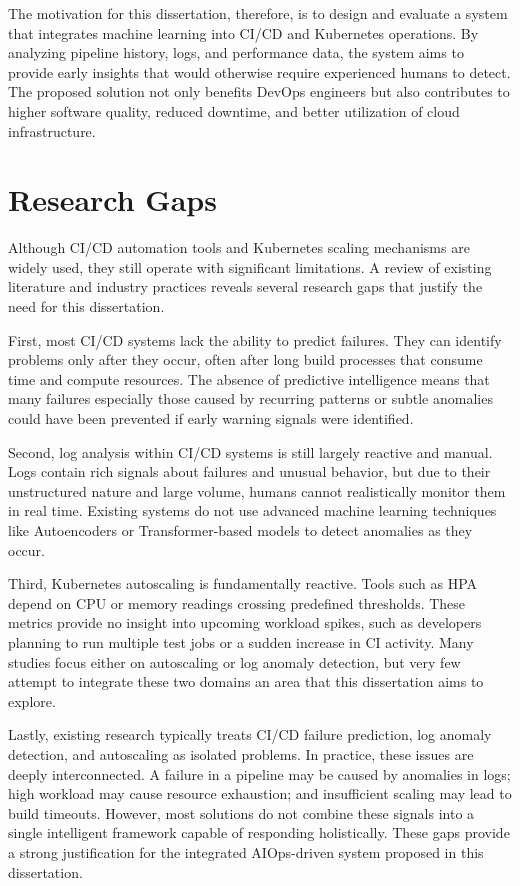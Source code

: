 \documentclass[a4paper,14pt,onecolumn]{report}
\begin{document}
The motivation for this dissertation, therefore, is to design and evaluate a system that integrates machine learning into CI/CD and Kubernetes operations. By analyzing pipeline history, logs, and performance data, the system aims to provide early insights that would otherwise require experienced humans to detect. The proposed solution not only benefits DevOps engineers but also contributes to higher software quality, reduced downtime, and better utilization of cloud infrastructure.

\section{Research Gaps}

Although CI/CD automation tools and Kubernetes scaling mechanisms are widely used, they still operate with significant limitations. A review of existing literature and industry practices reveals several research gaps that justify the need for this dissertation.

First, most CI/CD systems lack the ability to predict failures. They can identify problems only after they occur, often after long build processes that consume time and compute resources. The absence of predictive intelligence means that many failures especially those caused by recurring patterns or subtle anomalies could have been prevented if early warning signals were identified.

Second, log analysis within CI/CD systems is still largely reactive and manual. Logs contain rich signals about failures and unusual behavior, but due to their unstructured nature and large volume, humans cannot realistically monitor them in real time. Existing systems do not use advanced machine learning techniques like Autoencoders or Transformer-based models to detect anomalies as they occur.

Third, Kubernetes autoscaling is fundamentally reactive. Tools such as HPA depend on CPU or memory readings crossing predefined thresholds. These metrics provide no insight into upcoming workload spikes, such as developers planning to run multiple test jobs or a sudden increase in CI activity. Many studies focus either on autoscaling or log anomaly detection, but very few attempt to integrate these two domains an area that this dissertation aims to explore.

Lastly, existing research typically treats CI/CD failure prediction, log anomaly detection, and autoscaling as isolated problems. In practice, these issues are deeply interconnected. A failure in a pipeline may be caused by anomalies in logs; high workload may cause resource exhaustion; and insufficient scaling may lead to build timeouts. However, most solutions do not combine these signals into a single intelligent framework capable of responding holistically. These gaps provide a strong justification for the integrated AIOps-driven system proposed in this dissertation.
\end{document}
